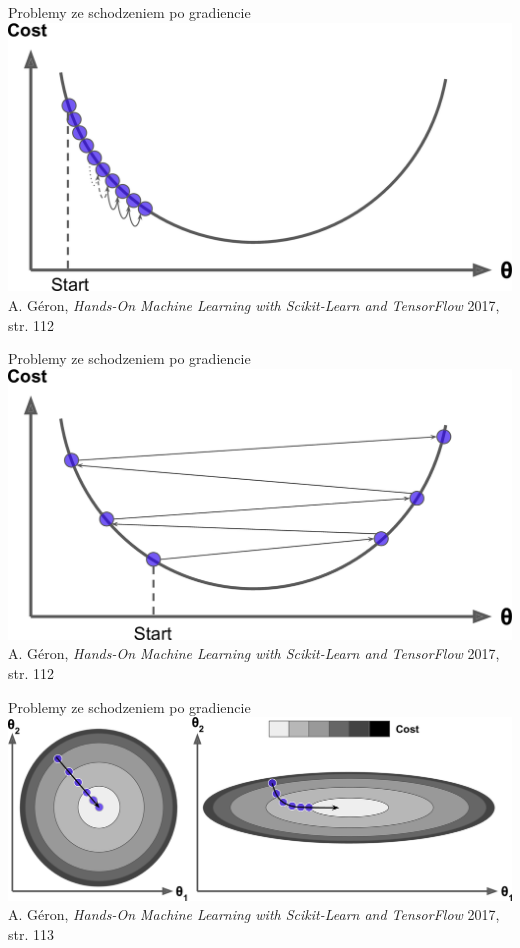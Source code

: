 \documentclass{sa}
\begin{document}
\begin{frame}{Problemy ze schodzeniem po gradiencie}
\centering
\includegraphics[width=.95\textwidth]{grad-e-toosmall.png}
{\vfill\footnotesize A. Géron, \emph{Hands-On Machine Learning with Scikit-Learn and TensorFlow} 2017, str. 112}
\end{frame}

\begin{frame}{Problemy ze schodzeniem po gradiencie}
\centering
\includegraphics[width=.95\textwidth]{grad-e-toolarge.png}
{\vfill\footnotesize A. Géron, \emph{Hands-On Machine Learning with Scikit-Learn and TensorFlow} 2017, str. 112}
\end{frame}

\begin{frame}{Problemy ze schodzeniem po gradiencie}
\centering
\includegraphics[width=.95\textwidth]{grad-nofscaling.png}
{\vfill\footnotesize A. Géron, \emph{Hands-On Machine Learning with Scikit-Learn and TensorFlow} 2017, str. 113}
\end{frame}
\end{document}
